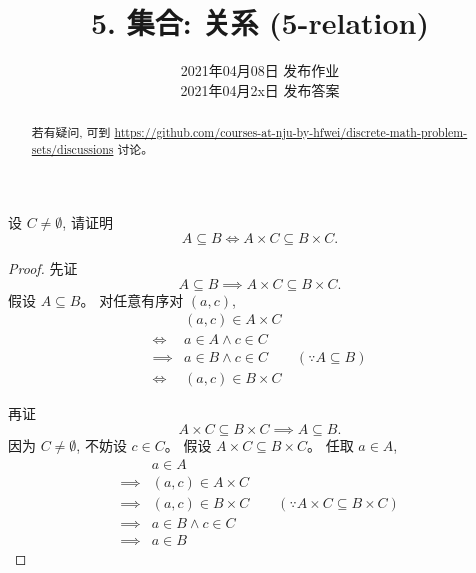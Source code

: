 \documentclass[a4paper, justified]{tufte-handout}
\title{5. 集合: 关系 (5-relation)}
\date{2021年04月08日 发布作业 \\ 2021年04月2x日 发布答案}
\begin{document}
\maketitle
\noplagiarism %
\begin{abstract}
  若有疑问, 可到 \url{https://github.com/courses-at-nju-by-hfwei/discrete-math-problem-sets/discussions}
  讨论。
\end{abstract}
\beginrequired

\begin{problem}
  设 $C \neq \emptyset$, 请证明
  \[
    A \subseteq B \iff A \times C \subseteq B \times C.
  \]
\end{problem}

\begin{proof}
  先证
  \[
    A \subseteq B \implies A \times C \subseteq B \times C.
  \]
  假设 $A \subseteq B$。
  对任意有序对 $(a, c)$,
  \begin{align}
    & (a, c) \in A \times C \\[6pt]
    \iff & a \in A \land c \in C \\[6pt]
    \implies & a \in B \land c \in C \qquad (\because A \subseteq B)\\[6pt]
    \iff & (a, c) \in B \times C
  \end{align}

  再证
  \[
    A \times C \subseteq B \times C \implies A \subseteq B.
  \]
  因为 $C \neq \emptyset$, 不妨设 $c \in C$。
  假设 $A \times C \subseteq B \times C$。
  任取 $a \in A$,
  \setcounter{equation}{0}
  \begin{align}
    & a \in A \\[6pt]
    \implies &(a, c) \in A \times C \\[6pt]
    \implies &(a, c) \in B \times C
      \qquad (\because A \times C \subseteq B \times C) \\[6pt]
    \implies & a \in B \land c \in C \\[6pt]
    \implies &a \in B
  \end{align}
\end{proof}
\end{document}
